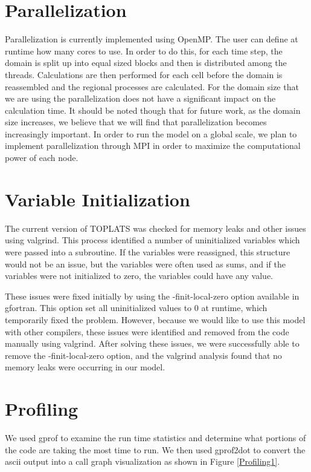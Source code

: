 \documentclass[pdftex,12pt,a4paper]{article}
\begin{document}
\section{Parallelization}

Parallelization is currently implemented using OpenMP. The user can define at runtime how many cores to use. In order to do this, for each time step, the domain is split up into equal sized blocks and then is distributed among the threads. Calculations are then performed for each cell before the domain is reassembled and the regional processes are calculated. For the domain size that we are using the parallelization does not have a significant impact on the calculation time. It should be noted though that for future work, as the domain size increases, we believe that we will find that parallelization becomes increasingly important. In order to run the model on a global scale, we plan to implement parallelization through MPI in order to maximize the computational power of each node.

\section{Variable Initialization}
The current version of TOPLATS was checked for memory leaks and other issues using valgrind. This process identified a number of uninitialized variables which were passed into a subroutine. If the variables were reassigned, this structure would not be an issue, but the variables were often used as sums, and if the variables were not initialized to zero, the variables could have any value. 

\vspace{1em}

These issues were fixed initially by using the -finit-local-zero option available in gfortran. This option set all uninitialized values to 0 at runtime, which temporarily fixed the problem. However, because we would like to use this model with other compilers, these issues were identified and removed from the code manually using valgrind. After solving these issues, we were successfully able to remove the -finit-local-zero option, and the valgrind analysis found that no memory leaks were occurring in our model.

\section{Profiling}

We used gprof to examine the run time statistics and determine what portions of the code are taking the most time to run. We then used gprof2dot to convert the ascii output into a call graph visualization as shown in Figure \ref{Profiling1}. 
\end{document}
